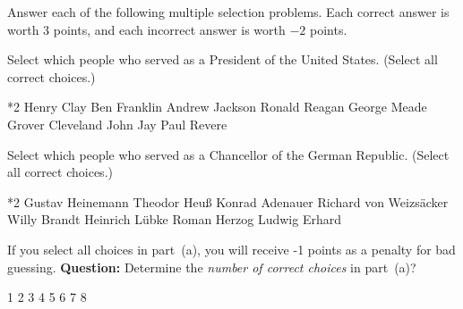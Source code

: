 \documentclass{article}
\begin{document}
\begin{qzbody}
\begin{quiz*}{\currQuiz}
\begin{questions}
\multipartquestion

    \item{} Answer each of the following multiple selection problems. Each correct answer
    is worth $3$ points, and each incorrect answer is worth $-2$ points.
    \begin{questions}

\rowsep{3pt}

        \item{} Select which people who served as a President
                     of the United States. (Select all correct choices.)

        \begin{manswers}*{2}%
            \bChoices[random=true]
                 Henry Clay\eAns
                 Ben Franklin\eAns
                  Andrew Jackson\eAns
                  Ronald Reagan\eAns
                 George Meade\eAns
                  Grover Cleveland\eAns
                 John Jay\eAns
                 Paul Revere\eAns
            \eChoices
        \end{manswers}

\rowsep{3pt}

        \item{} Select which people who served as a Chancellor of the
            German Republic. (Select all correct choices.)
        \begin{manswers}*{2}%
            \bChoices[nCols=2,random=true]
                 Gustav Heinemann\eAns
                 Theodor Heu{\ss}\eAns
                  Konrad Adenauer\eAns
                 Richard von Weizs\"{a}cker\eAns
                  Willy Brandt\eAns
                 Heinrich L\"{u}bke\eAns
                 Roman Herzog\eAns
                 Ludwig Erhard\eAns
            \eChoices
        \end{manswers}

\rowsep{3pt}

      \item{} If you select all choices in part~(a), you will
          receive -1 points as a penalty for bad guessing. \textbf{Question:}
          Determine the \emph{number of correct choices} in part~(a)?
          \begin{answers}{4}
          \bChoices[random=true]
             1\eAns
             2\eAns
             3\eAns
             4\eAns
             5\eAns
             6\eAns
             7\eAns
             8\eAns
          \eChoices
          \end{answers}
    \end{questions}


\end{questions}
\end{quiz*}
\end{qzbody}
\end{document}
